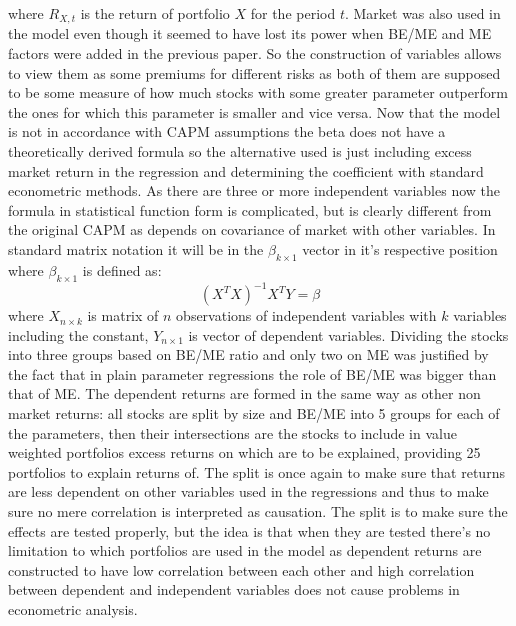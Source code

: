 \documentclass[a4paper,12pt]{article} %
\begin{document}
	where $R_{X, t}$ is the return of portfolio $X$ for the period $t$. Market was also used in the model even though it seemed to have lost its power when BE/ME and ME factors were added in the previous paper. So the construction of variables allows to view them as some premiums for different risks as both of them are supposed to be some measure of how much stocks with some greater parameter outperform the ones for which this parameter is smaller and vice versa. Now that the model is not in accordance with CAPM assumptions the beta does not have a theoretically derived formula so the alternative used is just including excess market return in the regression and determining the coefficient with standard econometric methods. As there are three or more independent variables now the formula in statistical function form is complicated, but is clearly different from the original CAPM as depends on covariance of market with other variables. In standard matrix notation it will be in the $\beta _{k\times 1}$ vector in it's respective position where $\beta _{k\times 1}$ is defined as:
	\[(X^TX)^{-1} X^TY = \beta\]
	where $X_{n\times k}$ is matrix of $n$ observations of independent variables with $k$ variables including the constant, $Y_{n\times 1}$ is vector of dependent variables.%
	Dividing the stocks into three groups based on BE/ME ratio and only two on ME was justified by the fact that in plain parameter regressions the role of BE/ME was bigger than that of ME.
	The dependent returns are formed in the same way as other non market returns: all stocks are split by size and BE/ME into 5 groups for each of the parameters, then their intersections are the stocks to include in value weighted portfolios excess returns on which are to be explained, providing 25 portfolios to explain returns of. The split is once again to make sure that returns are less dependent on other variables used in the regressions and thus to make sure no mere correlation is interpreted as causation. The split is to make sure the effects are tested properly, but the idea is that when they are tested there's no limitation to which portfolios are used in the model as dependent returns are constructed to have low correlation between each other and high correlation between dependent and independent variables does not cause problems in econometric analysis.
\end{document}
